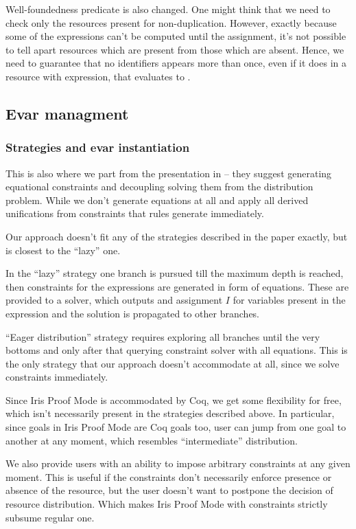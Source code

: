 Well-foundedness predicate is also changed.
One might think that we need to check only the resources present for non-duplication.
However, exactly because some of the expressions can't be computed until the assignment, it's not possible to tell apart resources which are present from those which are absent.
Hence, we need to guarantee that no identifiers appears more than once, even if it does in a resource with expression, that evaluates to \false.

\subsection{Evar managment}
\label{subsec:evar_managment}

\subsubsection{Strategies and evar instantiation}
\label{subsubsec:strategies_and_evars}

This is also where we part from the presentation in \citet{harlandResourceDistributionBooleanConstraints2003} -- they suggest generating equational constraints and decoupling solving them from the distribution problem.
While we don't generate equations at all and apply all derived unifications from constraints that rules generate immediately.

Our approach doesn't fit any of the strategies described in the paper exactly, but is closest to the ``lazy'' one.

In the ``lazy'' strategy one branch is pursued till the maximum depth is reached, then constraints for the expressions are generated in form of equations.
These are provided to a solver, which outputs and assignment \(I\) for variables present in the expression and the solution is propagated to other branches.

``Eager distribution'' strategy requires exploring all branches until the very bottoms and only after that querying constraint solver with all equations.
This is the only strategy that our approach doesn't accommodate at all, since we solve constraints immediately.

Since Iris Proof Mode is accommodated by Coq, we get some flexibility for free, which isn't necessarily present in the strategies described above.
In particular, since goals in Iris Proof Mode are Coq goals too, user can jump from one goal to another at any moment, which resembles ``intermediate'' distribution.

We also provide users with an ability to impose arbitrary constraints at any given moment.
This is useful if the constraints don't necessarily enforce presence or absence of the resource, but the user doesn't want to postpone the decision of resource distribution.
Which makes Iris Proof Mode with constraints strictly subsume regular one.


